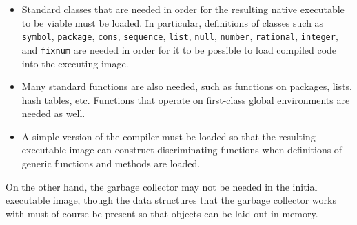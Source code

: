 \begin{itemize}
\item Standard classes that are needed in order for the resulting
  native executable to be viable must be loaded.  In particular,
  definitions of classes such as \texttt{symbol}, \texttt{package},
  \texttt{cons}, \texttt{sequence}, \texttt{list}, \texttt{null},
  \texttt{number}, \texttt{rational}, \texttt{integer}, and
  \texttt{fixnum} are needed in order for it to be possible to load
  compiled code into the executing image.
\item Many standard functions are also needed, such as functions on
  packages, lists, hash tables, etc.  Functions that operate on
  first-class global environments are needed as well.
\item A simple version of the compiler must be loaded so that the
  resulting executable image can construct discriminating functions
  when definitions of generic functions and methods are loaded.
\end{itemize}

On the other hand, the garbage collector may not be needed in the
initial executable image, though the data structures that the garbage
collector works with must of course be present so that objects can be
laid out in memory.

